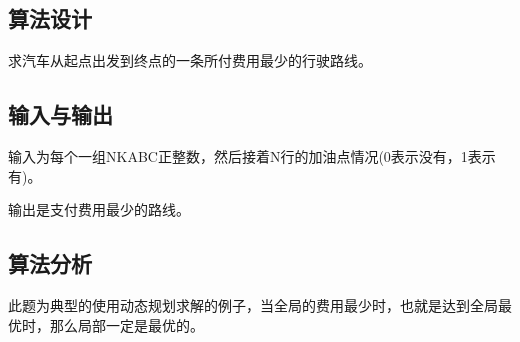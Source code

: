 \documentclass[UTF8]{ctexart}
\begin{document}
    \subsection{算法设计}
    求汽车从起点出发到终点的一条所付费用最少的行驶路线。

    \subsection{输入与输出}

    输入为每个一组NKABC正整数，然后接着N行的加油点情况(0表示没有，1表示有)。

    输出是支付费用最少的路线。

    \subsection{算法分析}
    此题为典型的使用动态规划求解的例子，当全局的费用最少时，也就是达到全局最优时，那么局部一定是最优的。
\end{document}
